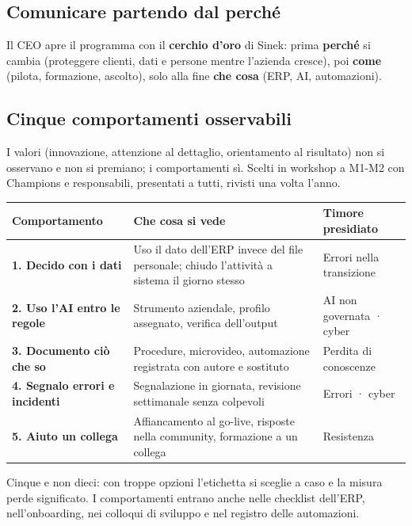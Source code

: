 \documentclass[11pt,a4paper]{article}
\begin{document}
\subsection{Comunicare partendo dal perché}\label{sec:13.1}
Il CEO apre il programma con il \textbf{cerchio d'oro} di Sinek: prima \textbf{perché} si cambia (proteggere clienti, dati e persone mentre l'azienda cresce), poi \textbf{come} (pilota, formazione, ascolto), solo alla fine \textbf{che cosa} (ERP, AI, automazioni).

\subsection{Cinque comportamenti osservabili}\label{sec:13.2}
I valori (innovazione, attenzione al dettaglio, orientamento al risultato) non si osservano e non si premiano; i comportamenti sì. Scelti in workshop a M1-M2 con Champions e responsabili, presentati a tutti, rivisti una volta l'anno.

{\small\renewcommand{\arraystretch}{1.25}
\begin{xltabular}{\linewidth}{@{}>{\raggedright\arraybackslash{}\hsize\hspace{0pt}}X>{\raggedright\arraybackslash{}\hsize\hspace{0pt}}X>{\raggedright\arraybackslash{}\hsize\hspace{0pt}}X@{}}
\toprule
\textbf{Comportamento} & \textbf{Che cosa si vede} & \textbf{Timore presidiato} \\
\midrule
\endhead
\textbf{1. Decido con i dati} & Uso il dato dell'ERP invece del file personale; chiudo l'attività a sistema il giorno stesso & Errori nella transizione \\
\textbf{2. Uso l'AI entro le regole} & Strumento aziendale, profilo assegnato, verifica dell'output & AI non governata · cyber \\
\textbf{3. Documento ciò che so} & Procedure, microvideo, automazione registrata con autore e sostituto & Perdita di conoscenze \\
\textbf{4. Segnalo errori e incidenti} & Segnalazione in giornata, revisione settimanale senza colpevoli & Errori · cyber \\
\textbf{5. Aiuto un collega} & Affiancamento al go-live, risposte nella community, formazione a un collega & Resistenza \\
\bottomrule
\end{xltabular}}

Cinque e non dieci: con troppe opzioni l'etichetta si sceglie a caso e la misura perde significato. I comportamenti entrano anche nelle checklist dell'ERP, nell'onboarding, nei colloqui di sviluppo e nel registro delle automazioni.
\end{document}
